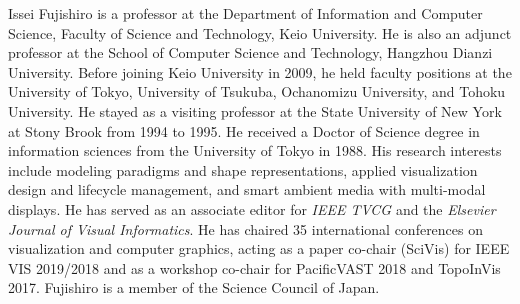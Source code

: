 \documentclass[10pt,journal,compsoc]{IEEEtran}
\begin{document}
\begin{IEEEbiography}{Issei Fujishiro}
is a professor at the Department of Information and Computer Science, Faculty of Science and Technology, Keio University. He is also an adjunct professor at the School of Computer Science and Technology, Hangzhou Dianzi University. 
Before joining Keio University in 2009, he held faculty positions at the University of Tokyo, University of Tsukuba, Ochanomizu University, and Tohoku University. He stayed as a visiting professor at the State University of New York at Stony Brook from 1994 to 1995. 
He received a Doctor of Science degree in information sciences from the University of Tokyo in 1988. His research interests include modeling paradigms and shape representations, applied visualization design and lifecycle management, and smart ambient media with multi-modal displays. He has served as an associate editor for \textit{IEEE TVCG} and the \textit{Elsevier Journal of Visual Informatics}. 
He has chaired 35 international conferences on visualization and computer graphics,
acting as a paper co-chair (SciVis) for IEEE VIS 2019/2018 and as a
workshop co-chair for PacificVAST 2018 and TopoInVis 2017.
Fujishiro is a member of the Science Council of Japan.
\end{IEEEbiography}





\end{document}
